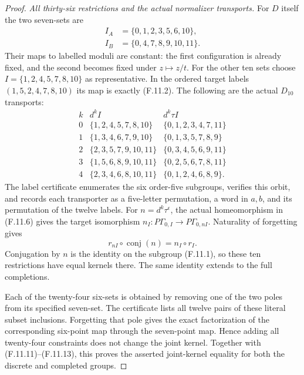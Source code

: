 \begin{proof}
\emph{All thirty-six restrictions and the actual normalizer transports.}
For $D$ itself the two seven-sets are
\[
 \begin{split}
 I_A&=\{0,1,2,3,5,6,10\},\\
 I_B&=\{0,4,7,8,9,10,11\}.
 \end{split}                                                   \tag{F.11.11}
\]
Their maps to labelled moduli are constant:
the first configuration is already fixed, and
the second becomes fixed under $z\mapsto z/t$.
For the other ten sets choose
$I=\{1,2,4,5,7,8,10\}$ as representative.
In the ordered target labels
$(1,5,2,4,7,8,10)$ its map is exactly (F.11.2).
The following are the actual $D_{10}$ transports:
\[
\begin{array}{c|l|l}
 k& d^k I&d^k\tau I\\ \hline
 0&\{1,2,4,5,7,8,10\}&\{0,1,2,3,4,7,11\}\\
 1&\{1,3,4,6,7,9,10\}&\{0,1,3,5,7,8,9\}\\
 2&\{2,3,5,7,9,10,11\}&\{0,3,4,5,6,9,11\}\\
 3&\{1,5,6,8,9,10,11\}&\{0,2,5,6,7,8,11\}\\
 4&\{2,3,4,6,8,10,11\}&\{0,1,2,4,6,8,9\}.
\end{array}                                                     \tag{F.11.12}
\]
The label certificate enumerates the six order-five
subgroups, verifies this orbit, and records each
transporter as a five-letter permutation, a word
in $a,b$, and its permutation of the twelve labels.
For $n=d^k\tau^\epsilon$, the actual homeomorphism
in (F.11.6) gives the target isomorphism
$n_I:P\Gamma_{0,I}\to P\Gamma_{0,nI}$.
Naturality of forgetting gives
\[
        r_{nI}\circ\operatorname{conj}(n)
                           =n_I\circ r_I .
                                                               \tag{F.11.13}
\]
Conjugation by $n$ is the identity on the subgroup
(F.11.1), so these ten restrictions have equal
kernels there.  The same identity extends to
the full completions.

Each of the twenty-four six-sets is obtained by
removing one of the two poles from its specified
seven-set.  The certificate lists all twelve
pairs of these literal subset inclusions.
Forgetting that pole gives the exact factorization
of the corresponding six-point map through the
seven-point map.  Hence adding all twenty-four
constraints does not change the joint kernel.
Together with (F.11.11)--(F.11.13), this proves
the asserted joint-kernel equality for both
the discrete and completed groups.


\end{proof}

